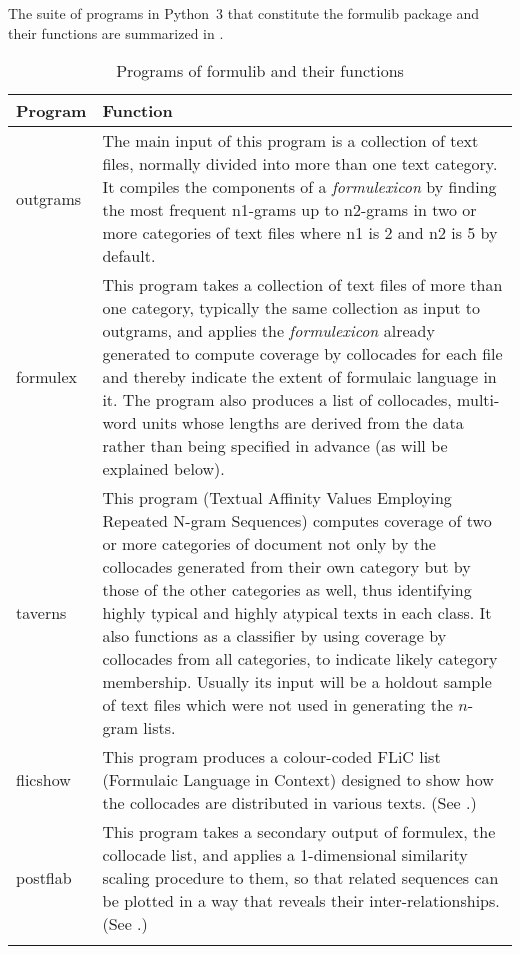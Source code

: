 \documentclass[output=paper]{langscibook}
\begin{document}
The suite of programs in Python~3 that constitute the formulib package and their functions are summarized in .

\begin{table}
\small
\caption{Programs of formulib and their functions\label{tab:forsyth:3}}
\begin{tabularx}{\textwidth}{>{\ttfamily}lQ}
\lsptoprule
Program & Function\\
\midrule
outgrams & The main input of this program is a collection of text files, normally divided into more than one text category. It compiles the components of a \textit{formulexicon} by finding the most frequent n1-grams up to n2-grams in two or more categories of text files where n1 is 2 and n2 is 5 by default.\\
formulex & This program takes a collection of text files of more than one category, typically the same collection as input to outgrams, and applies the \textit{formulexicon} already generated to compute coverage by collocades for each file and thereby indicate the extent of formulaic language in it. The program also produces a list of collocades, multi-word units whose lengths are derived from the data rather than being specified in advance (as will be explained below).\\
taverns & This program (Textual Affinity Values Employing Repeated N-gram Sequences) computes coverage of two or more categories of document not only by the collocades generated from their own category but by those of the other categories as well, thus identifying highly typical and highly atypical texts in each class. It also functions as a classifier by using coverage by collocades from all categories, to indicate likely category membership. Usually its input will be a holdout sample of text files which were not used in generating the $n$-gram lists.\\
flicshow & This program produces a colour-coded FLiC list (Formulaic Language in Context) designed to show how the collocades are distributed in various texts. (See .)\\
postflab & This program takes a secondary output of formulex, the collocade list, and applies a 1-dimensional similarity scaling procedure to them, so that related sequences can be plotted in a way that reveals their inter-relationships. (See .)\\
\lspbottomrule
\end{tabularx}
\end{table}
\end{document}
